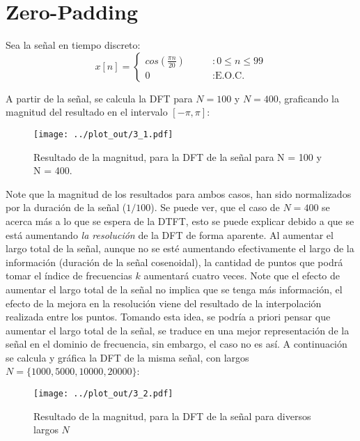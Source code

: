 \section{Zero-Padding}
	Sea la señal en tiempo discreto:
	\begin{equation}
				x[n] = \begin{cases}
							cos\left( \frac{\pi n}{20} \right)  & \qquad : 0 \leq n \leq 99 \\
							0  & \qquad : \text{E.O.C.}
						\end{cases}
						\label{eq:3_signal}
	\end{equation}
	
	A partir de la señal, se calcula la DFT para $N = 100$ y $N = 400$, graficando la magnitud del resultado en el intervalo $\left[ -\pi , \pi \right]$:
	\begin{figure}[H]
		\center
		\texttt{[image: ../plot\_out/3\_1.pdf]}
		\caption{Resultado de la magnitud, para la DFT de la señal para N = 100 y N = 400. }
		\label{fig:3_1_mag_plot}
	\end{figure}
	
	Note que la magnitud de los resultados para ambos casos, han sido normalizados por la duración de la señal ($1/100$). Se puede ver, que el caso de $N = 400$ se acerca más a lo que se espera de la \textsc{DTFT}, esto se puede explicar debido a que se está aumentando \textit{la resolución} de la \textsc{DFT} de forma aparente. Al aumentar el largo total de la señal, aunque no se esté aumentando efectivamente el largo de la información (duración de la señal cosenoidal), la cantidad de puntos que podrá tomar el índice de frecuencias $k$ aumentará cuatro veces. Note que el efecto de aumentar el largo total de la señal no implica que se tenga más información, el efecto de la mejora en la resolución viene del resultado de la interpolación realizada entre los puntos. Tomando esta idea, se podría a priori pensar que aumentar el largo total de la señal, se traduce en una mejor representación de la señal en el dominio de frecuencia, sin embargo, el caso no es así. A continuación se calcula y gráfica la DFT de la misma señal, con largos $ N = \{ 1000, 5000, 10000, 20000 \}$:
	\begin{figure}[H]
		\center
		\texttt{[image: ../plot\_out/3\_2.pdf]}
		\caption{Resultado de la magnitud, para la DFT de la señal para diversos largos $N$}
		\label{fig:3_2_ns}
	\end{figure}
	
